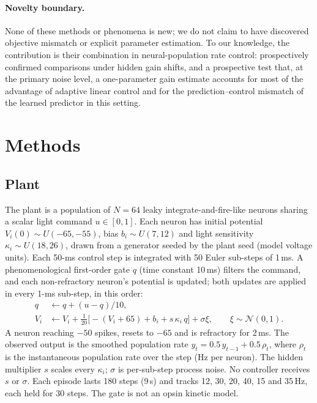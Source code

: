 \documentclass[11pt]{article}
\newcommand{\Hz}{\,Hz}
\begin{document}
\paragraph{Novelty boundary.} None of these methods or phenomena is new; we do not claim to have discovered objective mismatch or explicit parameter estimation. To our knowledge, the contribution is their combination in neural-population rate control: prospectively confirmed comparisons under hidden gain shifts, and a prospective test that, at the primary noise level, a one-parameter gain estimate accounts for most of the advantage of adaptive linear control and for the prediction--control mismatch of the learned predictor in this setting.

\section{Methods}
\subsection{Plant}
The plant is a population of $N=64$ leaky integrate-and-fire-like neurons sharing a scalar light command $u\in[0,1]$. Each neuron has initial potential $V_i(0)\sim U(-65,-55)$, bias $b_i\sim U(7,12)$ and light sensitivity $\kappa_i\sim U(18,26)$, drawn from a generator seeded by the plant seed (model voltage units). Each 50-ms control step is integrated with 50 Euler sub-steps of 1\,ms. A phenomenological first-order gate $q$ (time constant 10\,ms) filters the command, and each non-refractory neuron's potential is updated; both updates are applied in every 1-ms sub-step, in this order:
\begin{align}
q &\leftarrow q + (u-q)/10,\\
V_i &\leftarrow V_i + \tfrac{1}{20}\big[-(V_i+65) + b_i + s\,\kappa_i\, q\big] + \sigma\xi,\qquad \xi\sim\mathcal N(0,1).
\end{align}
A neuron reaching $-50$ spikes, resets to $-65$ and is refractory for 2\,ms. The observed output is the smoothed population rate $y_t=0.5\,y_{t-1}+0.5\,\rho_t$, where $\rho_t$ is the instantaneous population rate over the step (Hz per neuron). The hidden multiplier $s$ scales every $\kappa_i$; $\sigma$ is per-sub-step process noise. No controller receives $s$ or $\sigma$. Each episode lasts 180 steps (9\,s) and tracks 12, 30, 20, 40, 15 and 35\Hz, each held for 30 steps. The gate is not an opsin kinetic model.
\end{document}
